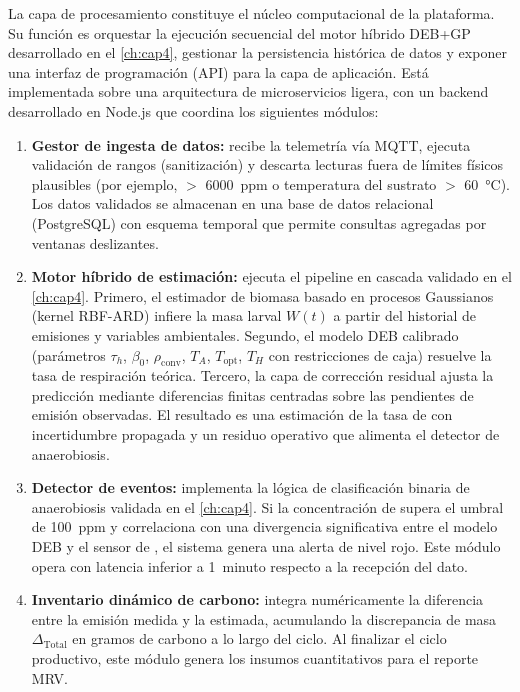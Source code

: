 La capa de procesamiento constituye el núcleo computacional de la plataforma. Su función es orquestar la ejecución secuencial del motor híbrido DEB+GP desarrollado en el \cref{ch:cap4}, gestionar la persistencia histórica de datos y exponer una interfaz de programación (API) para la capa de aplicación. Está implementada sobre una arquitectura de microservicios ligera, con un backend desarrollado en Node.js que coordina los siguientes módulos:

\begin{enumerate}
    \item \textbf{Gestor de ingesta de datos:} recibe la telemetría vía MQTT, ejecuta validación de rangos (sanitización) y descarta lecturas fuera de límites físicos plausibles (por ejemplo,  $>$ \num{6000}~ppm o temperatura del sustrato $>$ \num{60}~°C). Los datos validados se almacenan en una base de datos relacional (PostgreSQL) con esquema temporal que permite consultas agregadas por ventanas deslizantes.
    
    \item \textbf{Motor híbrido de estimación:} ejecuta el pipeline en cascada validado en el \cref{ch:cap4}. Primero, el estimador de biomasa basado en procesos Gaussianos (kernel RBF-ARD) infiere la masa larval $W(t)$ a partir del historial de emisiones y variables ambientales. Segundo, el modelo DEB calibrado (parámetros $\tau_h$, $\beta_0$, $\rho_{\text{conv}}$, $T_A$, $T_{\text{opt}}$, $T_H$ con restricciones de caja) resuelve la tasa de respiración teórica. Tercero, la capa de corrección residual ajusta la predicción mediante diferencias finitas centradas sobre las pendientes de emisión observadas. El resultado es una estimación de la tasa de  con incertidumbre propagada y un residuo operativo que alimenta el detector de anaerobiosis.
    
    \item \textbf{Detector de eventos:} implementa la lógica de clasificación binaria de anaerobiosis validada en el \cref{ch:cap4}. Si la concentración de  supera el umbral de \num{100}~ppm y correlaciona con una divergencia significativa entre el modelo DEB y el sensor de , el sistema genera una alerta de nivel rojo. Este módulo opera con latencia inferior a \num{1}~minuto respecto a la recepción del dato.
    
    \item \textbf{Inventario dinámico de carbono:} integra numéricamente la diferencia entre la emisión medida y la estimada, acumulando la discrepancia de masa $\Delta_{\text{Total}}$ en gramos de carbono a lo largo del ciclo. Al finalizar el ciclo productivo, este módulo genera los insumos cuantitativos para el reporte MRV.
\end{enumerate}

